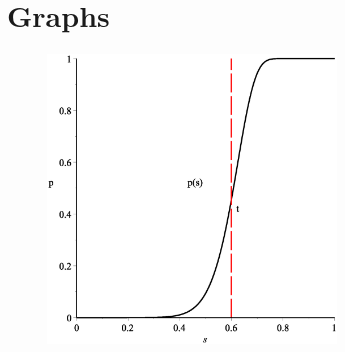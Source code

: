 
\section{Graphs}
\label{sec:graph}
\begin{figure}[H]
	\includegraphics[width=290px]{img/pGraphGood.eps}
	\label{fig:p_graph_good}
\end{figure}